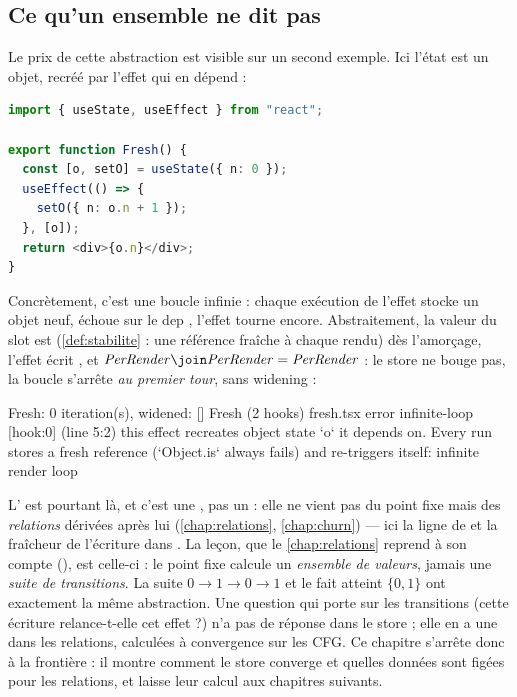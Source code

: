 \subsection{Ce qu'un ensemble ne dit pas}

Le prix de cette abstraction est visible sur un second exemple. Ici l'état
est un objet, recréé par l'effet qui en dépend :

\begin{lstlisting}[language=TypeScript,caption={Un objet recréé dans ses propres deps (\file{/tmp/ch13/fresh.tsx})},label={lst:point-fixe-composant-fresh}]
import { useState, useEffect } from "react";

export function Fresh() {
  const [o, setO] = useState({ n: 0 });
  useEffect(() => {
    setO({ n: o.n + 1 });
  }, [o]);
  return <div>{o.n}</div>;
}
\end{lstlisting}

Concrètement, c'est une boucle infinie : chaque exécution de l'effet stocke
un objet neuf,  échoue sur le dep \code{[o]}, l'effet
tourne encore. Abstraitement, la valeur du slot est 
(\cref{def:stabilite} : \og une référence fraîche à chaque rendu\fg) dès
l'amorçage, l'effet écrit , et
$\mathit{PerRender} \join \mathit{PerRender} = \mathit{PerRender}$ : le
store ne bouge pas, la boucle s'arrête \emph{au premier tour}, sans
widening :

\begin{sortie}
  [verbose] Fresh: 0 iteration(s), widened: []
  Fresh  (2 hooks)  fresh.tsx
    error  infinite-loop  [hook:0]  (line 5:2)  this effect recreates object state `o` it depends on. Every run stores a fresh reference (`Object.is` always fails) and re-triggers itself: infinite render loop
\end{sortie}

L'\Error{} est pourtant là, et c'est une \Error{}, pas un \Warning{} : elle
ne vient pas du point fixe mais des \emph{relations} dérivées après lui
(\cref{chap:relations}, \cref{chap:churn}) --- ici la ligne  de  et la fraîcheur de l'écriture dans
. La leçon, que le \cref{chap:relations} reprend à son
compte (), est celle-ci : le point fixe calcule un \emph{ensemble de
valeurs}, jamais une \emph{suite de transitions}. La suite $0 \to 1 \to 0 \to
1$ et le fait \og atteint $\{0, 1\}$\fg{} ont exactement la même abstraction.
Une question qui porte sur les transitions (\og cette écriture
relance-t-elle cet effet ?\fg) n'a pas de réponse dans le store ; elle en a
une dans les relations, calculées à convergence sur les CFG. Ce chapitre
s'arrête donc à la frontière : il montre comment le store converge et quelles
données sont figées pour les relations, et laisse leur calcul aux chapitres
suivants.

